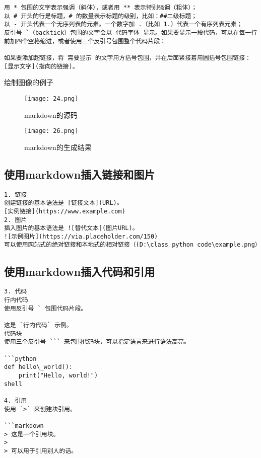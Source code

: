 \documentclass[a4paper, 12pt]{article}
\begin{document}
\begin{verbatim}
用 * 包围的文字表示强调（斜体），或者用 ** 表示特别强调（粗体）；
以 # 开头的行是标题，# 的数量表示标题的级别，比如：##二级标题；
以 - 开头代表一个无序列表的元素。一个数字加 .（比如 1.）代表一个有序列表元素；
反引号 `（backtick）包围的文字会以 代码字体 显示。如果要显示一段代码，可以在每一行前加四个空格缩进，或者使用三个反引号包围整个代码片段：

如果要添加超链接，将 需要显示 的文字用方括号包围，并在后面紧接着用圆括号包围链接：[显示文字](指向的链接)。
  \end{verbatim}


绘制图像的例子
  \begin{figure}[H]
  \centering
    \texttt{[image: 24.png]}
  \caption{markdown的源码}
   \end{figure}  
   
 

  \begin{figure}[H]
  \centering
    \texttt{[image: 26.png]}
  \caption{markdown的生成结果}
   \end{figure}  

   
\subsection{使用markdown插入链接和图片}
\begin{verbatim}
1. 链接
创建链接的基本语法是 [链接文本](URL)。
[实例链接](https://www.example.com)
2. 图片
插入图片的基本语法是 ![替代文本](图片URL)。
![示例图片](https://via.placeholder.com/150)
可以使用网站式的绝对链接和本地式的相对链接（(D:\class python code\example.png）
\end{verbatim}

\subsection{使用markdown插入代码和引用}

\begin{verbatim}
3. 代码
行内代码
使用反引号 ` 包围代码片段。

这是 `行内代码` 示例。
代码块
使用三个反引号 ``` 来包围代码块，可以指定语言来进行语法高亮。

```python
def hello\_world():
    print("Hello, world!")
shell

4. 引用
使用 `>` 来创建块引用。

```markdown
> 这是一个引用块。
> 
> 可以用于引用别人的话。
\end{verbatim}
\end{document}
